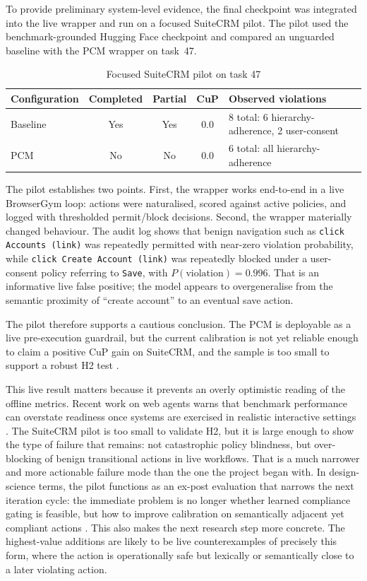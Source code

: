 \documentclass[12pt,a4paper]{article}
\begin{document}
To provide preliminary system-level evidence, the final checkpoint was
integrated into the live wrapper and run on a focused SuiteCRM pilot. The pilot
used the benchmark-grounded Hugging Face checkpoint and compared an unguarded
baseline with the PCM wrapper on task~47.

\begin{table}[h]
\centering\small
\caption{Focused SuiteCRM pilot on task 47}
\label{tab:suitecrm_pilot}
\begin{tabular}{@{} l c c c p{5.8cm} @{}}
\toprule
\textbf{Configuration} & \textbf{Completed} & \textbf{Partial} & \textbf{CuP} & \textbf{Observed violations} \\
\midrule
Baseline & Yes & Yes & 0.0 & 8 total: 6 hierarchy-adherence, 2 user-consent \\
PCM & No & No & 0.0 & 6 total: all hierarchy-adherence \\
\bottomrule
\end{tabular}
\end{table}

The pilot establishes two points. First, the wrapper works end-to-end in a live
BrowserGym loop: actions were naturalised, scored against active policies, and
logged with thresholded permit/block decisions. Second, the wrapper materially
changed behaviour. The audit log shows that benign navigation such as
\texttt{click Accounts (link)} was repeatedly permitted with near-zero
violation probability, while \texttt{click Create Account (link)} was
repeatedly blocked under a user-consent policy referring to \texttt{Save},
with $P(\text{violation}) = 0.996$. That is an informative live false
positive; the model appears to overgeneralise from the semantic proximity of
``create account'' to an eventual save action.

The pilot therefore supports a cautious conclusion. The PCM is deployable as a
live pre-execution guardrail, but the current calibration is not yet reliable
enough to claim a positive CuP gain on SuiteCRM, and the sample is too small to
support a robust H2 test \citep{wohlin2012experimentation}.

This live result matters because it prevents an overly optimistic reading of the
offline metrics. Recent work on web agents warns that benchmark performance can
overstate readiness once systems are exercised in realistic interactive settings
\citep{xue2025illusion}. The SuiteCRM pilot is too small to validate H2, but it
is large enough to show the type of failure that remains: not catastrophic
policy blindness, but over-blocking of benign transitional actions in live
workflows. That is a much narrower and more actionable failure mode than the
one the project began with. In design-science terms, the pilot functions as an
ex-post evaluation that narrows the next iteration cycle: the immediate problem
is no longer whether learned compliance gating is feasible, but how to improve
calibration on semantically adjacent yet compliant actions
\citep{venable2016feds,wohlin2012experimentation}. This also makes the next
research step more concrete. The highest-value additions are likely to be live
counterexamples of precisely this form, where the action is operationally safe
but lexically or semantically close to a later violating action.
\end{document}

